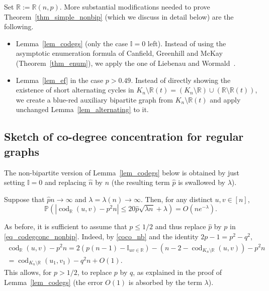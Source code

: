 \documentclass[12pt,reqno]{amsart}
\newcommand{\Prob} {\mathbb {P}}
\newcommand{\prob}[1]{\Prob\left(#1\right)}
\newcommand{\R} {\mathbb R}
\newcommand{\I} {\mathbb I}
\newcommand{\cod}{\operatorname{cod}}
\theoremstyle{definition}
\newenvironment{manuallemma}[1]{%
  \renewcommand\themanuallemmainner{#1}%
  \manuallemmainner
}
{
\endmanuallemmainner
}
\begin{document}
	Set $\R:=\R(n,p)$. More substantial modifications needed to prove Theorem~\ref{thm_simple_nonbip} (which we discuss in detail below) are the following.
\begin{itemize}
  \item Lemma~\ref{lem_codegs} (only the case $\I=0$ left). Instead of using the asymptotic enumeration formula of Canfield, Greenhill and McKay (Theorem~\ref{thm_enum}), we apply the one of Liebenau and Wormald~\cite{LW2017}.
  \item Lemma~\ref{lem_ef} in the case $p > 0.49$. Instead of directly showing the existence of short alternating cycles in $K_n\setminus \R(t)=(K_n\setminus\R)\cup(\R\setminus \R(t))$, we create a blue-red auxiliary bipartite graph from $K_n \setminus \R(t)$ and apply unchanged Lemma~\ref{lem_alternating} to it.
\end{itemize}




\subsection{Sketch of co-degree concentration for regular graphs}
The non-bipartite version of Lemma~\ref{lem_codegs} below is obtained by just setting $\I=0$ and replacing $\hat n$ by $n$ (the resulting term $\hat p$ is swallowed by $\lambda$).

\medskip

\begin{manuallemma}{\ref{lem_codegs}$'$}
  \label{lem_codegs_nonbip}
  Suppose that $\hat p n  \to \infty$  and  $\lambda = \lambda(n)\to \infty$.
  Then, for any distinct $u, v \in [n]$,
  \begin{equation}
    \label{eq_codegconc_nonbip}
    \prob{
    |\cod_{\R}(u,v) - p^2 n| \le 20\hat p\sqrt{ \lambda n}  + \lambda} = O\left(  n e^{ - \lambda } \right).
  \end{equation}
\end{manuallemma}

\medskip

\noindent As before, it is sufficient to assume that $p \le 1/2$ and thus replace $\hat p$ by $p$ in \eqref{eq_codegconc_nonbip}. Indeed, by \eqref{coco_nb} and the identity $2p-1=p^2-q^2$,
\begin{equation*}
  \begin{split}
    \cod_{\R}(u, v)-p^2n = 2(p(n-1) - \I_{uv \in \R}) - (n - 2 - \cod_{K_n \setminus \R}(u,v))-p^2n \\
    = \cod_{K_n \setminus \R}(u_1,v_1) - q^2n + O(1).
  \end{split}
	\end{equation*}
This allows, for $p>1/2$, to replace $p$ by $q$, as explained in the proof of Lemma~\ref{lem_codegs} (the error $O(1)$ is absorbed by the term $\lambda$).
\end{document}
